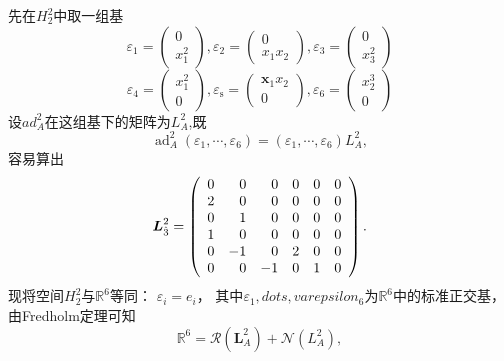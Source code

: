 \begin{solve}
  先在\(H_2^2\)中取一组基
  \[
    \varepsilon _ { 1 } = \left(
      \begin{array} { l }
        { 0 } \\
        { x _ { 1 } ^ { 2 } }
      \end{array}
    \right) ,
    \varepsilon _ { 2 } = \left(
      \begin{array} { c }
        { 0 } \\
        { x _ { 1 } x _ { 2 } }
      \end{array}
    \right) ,
    \varepsilon _ { 3 } = \left(
      \begin{array} { l }
        { 0 } \\
        { x _ { 3 } ^ { 2 } }
      \end{array}
    \right)
  \]
  \[
    \varepsilon _ { 4 } = \left(
      \begin{array} { l }
        { x _ { 1 } ^ { 2 } } \\
        { 0 }
      \end{array}
    \right) ,
    \varepsilon _ { \mathrm { s } } = \left(
      \begin{array} { c }
        { \boldsymbol { x } _ { 1 } x _ { 2 } } \\
        { 0 }
      \end{array}
    \right) ,
    \varepsilon _ { 6 } = \left(
      \begin{array} { l }
        { x _ { 2 } ^ { 3 } } \\
        { 0 }
      \end{array}
    \right)
  \]
  设\(ad_A^2\)在这组基下的矩阵为\(L_A^2\),既
  \[
    \operatorname { ad } _ { A } ^ { 2 }
    \left( \varepsilon _ { 1 } , \cdots , \varepsilon _ { 6 } \right)
=   \left( \varepsilon _ { 1 } , \cdots , \varepsilon _ { 6 } \right)
L_A^2,
\]
容易算出
\begin{equation}
  \boldsymbol { L } _ { \hat { 3 } } ^ { 2 } = \left(
    \begin{array} { r r r r r r }
      { 0 } & { 0 } & { 0 } & { 0 } & { 0 } & { 0 } \\
      { 2 } & { 0 } & { 0 } & { 0 } & { 0 } & { 0 } \\
      { 0 } & { 1 } & { 0 } & { 0 } & { 0 } & { 0 } \\
      { 1 } & { 0 } & { 0 } & { 0 } & { 0 } & { 0 } \\
      { 0 } & { - 1 } & { 0 } & { 2 } & { 0 } & { 0 } \\
      { 0 } & { 0 } & { - 1 } & { 0 } & { 1 } & { 0 }
    \end{array}
  \right).  
\label{eq:1.4.18}
\end{equation}
现将空间\(H_2^2\)与\(\mathbb{R}^6\)等同：
$\varepsilon _ { i } = e _ { i }$，
其中$\varepsilon_1,dots,varepsilon_6$为\(\mathbb{R}^6\)中的标准正交基，由Fredholm定理可知
\[
\mathbb { R } ^ { 6 } = \mathscr { R } \left( \boldsymbol { L } _ { A } ^ { 2 } \right) + \mathscr { N } \left( L _ { A } ^ { 2 } \right),
\]


\end{solve}
